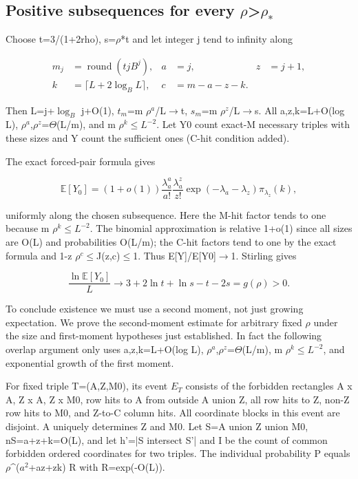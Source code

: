 \documentclass[11pt]{article}
\begin{document}
\subsection{Positive subsequences for every $\rho$>$\rho_{*}$}

Choose t=3/(1+2rho), s=$\rho$*t and let integer j tend to infinity along

\[
\begin{aligned}m_j&=\operatorname{round}(tjB^j),& a&=j,&z&=j+1,\\
k&=\lceil L+2\log_B L\rceil,&c&=m-a-z-k.
\end{aligned}
\]

Then L=j+$\log_B$ j+O(1), $t_{m}$=m $\rho^{a}$/L\ensuremath{\to}t, $s_{m}$=m $\rho^{z}$/L\ensuremath{\to}s. All a,z,k=L+O(log L), $\rho^{a}$,$\rho^{z}$=$\Theta$(L/m), and m $\rho^{k}$\ensuremath{\leq}$L^{-2}$. Let Y0 count exact-M necessary triples with these sizes and Y count the sufficient ones (C-hit condition added).

The exact forced-pair formula gives

\[
\mathbb E[Y_0]=(1+o(1))\frac{\lambda_a^a}{a!}\frac{\lambda_a^z}{z!}
\exp(-\lambda_a-\lambda_z)\pi_{\lambda_z}(k),
\]

uniformly along the chosen subsequence. Here the M-hit factor tends to one because m $\rho^{k}$\ensuremath{\leq}$L^{-2}$. The binomial approximation is relative 1+o(1) since all sizes are O(L) and probabilities O(L/m); the C-hit factors tend to one by the exact formula and 1-z $\rho^{c}$\ensuremath{\leq}J(z,c)\ensuremath{\leq}1. Thus E[Y]/E[Y0]\ensuremath{\to}1. Stirling gives

\[
\frac{\ln\mathbb E[Y_0]}{L}\longrightarrow3+2\ln t+\ln s-t-2s=g(\rho)>0.
\]

To conclude existence we must use a second moment, not just growing expectation. We prove the second-moment estimate for arbitrary fixed $\rho$ under the size and first-moment hypotheses just established. In fact the following overlap argument only uses a,z,k=L+O(log L), $\rho^{a}$,$\rho^{z}$=$\Theta$(L/m), m $\rho^{k}$\ensuremath{\leq}$L^{-2}$, and exponential growth of the first moment.

For fixed triple T=(A,Z,M0), its event $E_T$ consists of the forbidden rectangles A x A, Z x A, Z x M0, row hits to A from outside A union Z, all row hits to Z, non-Z row hits to M0, and Z-to-C column hits. All coordinate blocks in this event are disjoint. A uniquely determines Z and M0. Let S=A union Z union M0, nS=a+z+k=O(L), and let h'=|S intersect S'| and I be the count of common forbidden ordered coordinates for two triples. The individual probability P equals $\rho$\textasciicircum{}($a^{2}$+az+zk) R with R=exp(-O(L)).
\end{document}
